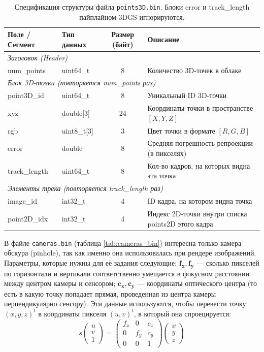 \begin{table}[htbp]
	\centering
	\begin{tabularx}{\textwidth}{llcX}
		\toprule
		\textbf{Поле / Сегмент} & \textbf{Тип данных} & \textbf{Размер (байт)} & \textbf{Описание} \\
		\midrule
		\multicolumn{4}{l}{\textit{Заголовок (Header)}} \\
		\quad num\_points & uint64\_t & 8 & Количество 3D-точек в облаке \\
		\midrule
		\multicolumn{4}{l}{\textit{Блок 3D-точки (повторяется num\_points раз)}} \\
		\quad point3D\_id & uint64\_t & 8 & Уникальный ID 3D-точки \\
		\quad xyz & double[3] & 24 & Координаты точки в пространстве $[X, Y, Z]$ \\
		\quad rgb & uint8\_t[3] & 3 & Цвет точки в формате $[R, G, B]$ \\
		\quad error & double & 8 & Средняя погрешность репроекции (в пикселях) \\
		\quad track\_length & uint64\_t & 8 & Кол-во кадров, на которых видна эта точка \\
		\midrule
		\multicolumn{4}{l}{\textit{Элементы трека (повторяется track\_length раз)}} \\
		\quad image\_id & int32\_t & 4 & ID кадра, на котором видна точка \\
		\quad point2D\_idx & int32\_t & 4 & Индекс 2D-точки внутри списка points2D этого кадра \\
		\bottomrule
	\end{tabularx}
	\caption{Спецификация структуры файла \texttt{points3D.bin}. Блоки error и track\_length пайплайном 3DGS игнорируются.}
	\label{tab:points3d_bin}
\end{table}

В файле \texttt{cameras.bin} (таблица \ref{tab:cameras_bin}) интересна только камера обскура (pinhole), так как именно она использовалась при рендере изображений. Параметры, которые нужны для её задания следующие: $\mathbf{f_x, f_y}$ --- сколько пикселей по горизонтали и вертикали соответственно умещается в фокусном расстоянии между центром камеры и сенсором; $\mathbf{c_x, c_y}$ --- координаты оптического центра (то есть в какую точку попадает прямая, проведенная из центра камеры перпендикулярно сенсору). Эти данные используются, чтобы перевести точку $(x, y, z)^t$ в координаты пикселя $(u, v)^t$, в который она спроецируется:
%
\[
s \begin{pmatrix} u \\ v \\ 1 \end{pmatrix} =
\begin{pmatrix}
	f_x & 0 & c_x \\
	0 & f_y & c_y \\
	0 & 0 & 1
\end{pmatrix}
\begin{pmatrix} x \\ y \\ z \end{pmatrix}
\]
%

